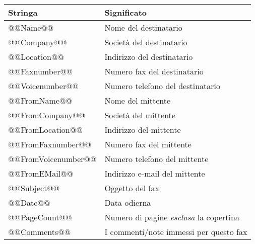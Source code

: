 \documentclass[a4paper,10pt]{scrartcl}
\begin{document}
\begin{center}
\begin{tabular}{|l|l|}
\hline
\bfseries Stringa & \bfseries Significato \\
\hline\hline
\ttfamily @@Name@@ & Nome del destinatario \\\hline
\ttfamily @@Company@@ & Società del destinatario \\\hline
\ttfamily @@Location@@ & Indirizzo del destinatario \\\hline
\ttfamily @@Faxnumber@@ & Numero fax del destinatario \\\hline
\ttfamily @@Voicenumber@@ & Numero telefono del destinatario \\\hline
\ttfamily @@FromName@@ & Nome del mittente \\\hline
\ttfamily @@FromCompany@@ & Società del mittente \\\hline
\ttfamily @@FromLocation@@ & Indirizzo del mittente \\\hline
\ttfamily @@FromFaxnumber@@ & Numero fax del mittente \\\hline
\ttfamily @@FromVoicenumber@@ & Numero telefono del mittente \\\hline
\ttfamily @@FromEMail@@ & Indirizzo e-mail del mittente \\\hline
\ttfamily @@Subject@@ & Oggetto del fax \\\hline
\ttfamily @@Date@@ & Data odierna \\\hline
\ttfamily @@PageCount@@ & Numero di pagine \textit{esclusa} la copertina \\\hline
\ttfamily @@Comments@@ & I commenti/note immessi per questo fax \\\hline
\end{tabular}
\end{center}
\end{document}
